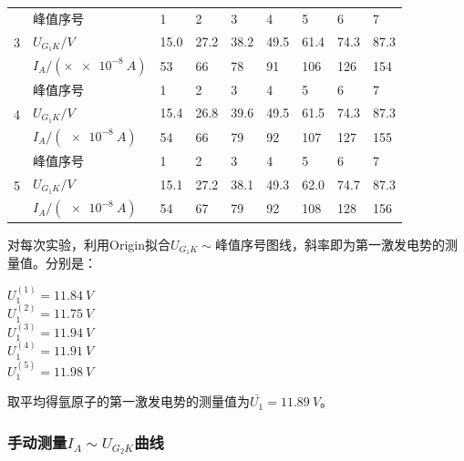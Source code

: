 \documentclass[]{../../templates/Report}%
\begin{document}
\begin{fullreportonly}
\begin{table}[htbp]
\begin{tabular}{C{.08\textwidth}C{.15\textwidth}C{.08\textwidth}C{.08\textwidth}C{.08\textwidth}C{.08\textwidth}C{.08\textwidth}C{.08\textwidth}C{.08\textwidth}}
     & 峰值序号 & 1 & 2 & 3 & 4 & 5 & 6 & 7 \\
    & $U_{G_1K} / \si{V}$ & 15.0 & 27.2 & 38.2 & 49.5 & 61.4 & 74.3 & 87.3 \\
    & $I_A/(\times \SI{e-8}{A})$ & 53 & 66 & 78 & 91 & 106 & 126 & 154 \\
    \midrule

     & 峰值序号 & 1 & 2 & 3 & 4 & 5 & 6 & 7 \\
    & $U_{G_1K} / \si{V}$ & 15.4 & 26.8 & 39.6 & 49.5 & 61.5 & 74.3 & 87.3 \\
    & $I_A/(\SI{e-8}{A})$ & 54 & 66 & 79 & 92 & 107 & 127 & 155 \\
    \midrule

     & 峰值序号 & 1 & 2 & 3 & 4 & 5 & 6 & 7 \\
    & $U_{G_1K} / \si{V}$ & 15.1 & 27.2 & 38.1 & 49.3 & 62.0 & 74.7 & 87.3 \\
    & $I_A/(\SI{e-8}{A})$ & 54 & 67 & 79 & 92 & 108 & 128 & 156 \\ 
    \bottomrule
  \end{tabular}
\end{table}

对每次实验，利用Origin拟合$U_{G_1K} \sim $峰值序号图线，斜率即为第一激发电势的测量值。分别是：

\begin{center}
    $U_1^{(1)} = \SI{11.84}{V}$ \\ %
    $U_1^{(2)} = \SI{11.75}{V}$    \\ %
    $U_1^{(3)} = \SI{11.94}{V}$ \\ %
    $U_1^{(4)} = \SI{11.91}{V}$ \\ %
    $U_1^{(5)} = \SI{11.98}{V}$ \\ %
\end{center}

取平均得氩原子的第一激发电势的测量值为$\bar{U_1} =  \SI{11.89}{V}$。

\subsubsection{手动测量$I_A \sim U_{G_2K}$曲线}


\end{fullreportonly}
\end{document}
